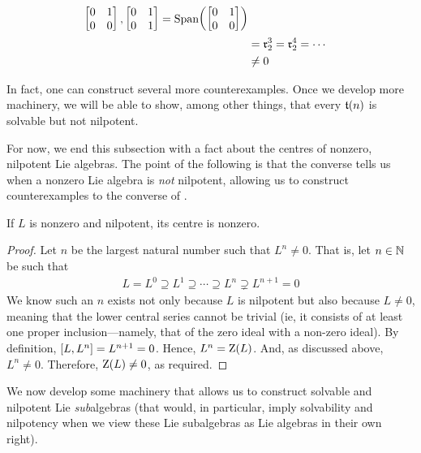 \begin{boxcexample}
\begin{align*}
{{\begin{bmatrix}
                    0 & 1 \\ 0 & 0
                \end{bmatrix},
                \begin{bmatrix}
                    0 & 1 \\ 0 & 1
                \end{bmatrix}
            }
        } = \operatorname{Span}\!\left( 
            \begin{bmatrix}
                0 & 1 \\ 0 & 0
            \end{bmatrix}
         \right) \\
        &= \mathfrak{r}_2^{3} = \mathfrak{r}_2^{4} = \cdots \\
        &\neq 0
    \end{align*}
\end{boxcexample}

In fact, one can construct several more counterexamples. Once we develop more machinery, we will be able to show, among other things, that every $\mathfrak{t}\!\left( n \right)$ is solvable but not nilpotent.

For now, we end this subsection with a fact about the centres of nonzero, nilpotent Lie algebras. The point of the following is that the converse tells us when a nonzero Lie algebra is \textit{not} nilpotent, allowing us to construct counterexamples to the converse of .

\begin{boxlemma}\label{Ch1:Lemma:NilpotentCentreNonzero}
    If $L$ is nonzero and nilpotent, its centre is nonzero.
\end{boxlemma}
\begin{proof}
    Let $n$ be the largest natural number such that $L^n \neq 0$. That is, let $n \in \mathbb{N}$ be such that
    \begin{align*}
        L = L^0 \supseteq L^1 \supseteq \cdots \supseteq L^n \supsetneq L^{n+1} = 0
    \end{align*}
    We know such an $n$ exists not only because $L$ is nilpotent but also because $L \neq 0$, meaning that the lower central series cannot be trivial (ie, it consists of at least one proper inclusion---namely, that of the zero ideal with a non-zero ideal). By definition, $\left[ L, L^n \right] = L^{n+1} = 0$. Hence, $L^n = \operatorname{Z}\!\left( L \right)$. And, as discussed above, $L^n \neq 0$. Therefore, $\operatorname{Z}\!\left( L \right) \neq 0$, as required.
\end{proof}

We now develop some machinery that allows us to construct solvable and nilpotent Lie \textit{sub}algebras (that would, in particular, imply solvability and nilpotency when we view these Lie subalgebras as Lie algebras in their own right).

